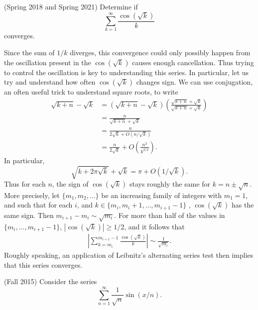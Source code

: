 \documentclass[answers]{exam}
\DeclareMathOperator{\RR}{\mathbb{R}}
\theoremstyle{problemstyle}
\newcommand{\1}[1]{\textbf{1}_{\left[#1\right]}} %
\begin{document}
\begin{questions}
\question (Spring 2018 and Spring 2021) Determine if
%
\[ \sum_{k = 1}^\infty \frac{\cos(\sqrt{k})}{k} \]
%
converges.
\begin{solution}
    Since the sum of $1/k$ diverges, this convergence could only possibly happen from the oscillation present in the $\cos(\sqrt{k})$ causes enough cancellation. Thus trying to control the oscillation is key to understanding this series. In particular, let us try and understand how often $\cos(\sqrt{k})$ changes sign. We can use conjugation, an often useful trick to understand square roots, to write
    \begin{align*}
        \sqrt{k+n} - \sqrt{k} &= (\sqrt{k+n} - \sqrt{k}) \left( \frac{\sqrt{k+n} + \sqrt{k}}{\sqrt{k+n} + \sqrt{k}} \right)\\
        &= \frac{n}{\sqrt{k+n} + \sqrt{k}}\\
        &= \frac{n}{2\sqrt{k} + O(n/\sqrt{k})}\\
        &= \frac{n}{2\sqrt{k}} + O \left( \frac{n^2}{k^{3/2}} \right).
    \end{align*}
    In particular,
    \[ \sqrt{k + 2 \pi \sqrt{k}} + \sqrt{k} = \pi + O(1/\sqrt{k}). \]
    Thus for each $n$, the sign of $\cos(\sqrt{k})$ stays roughly the same for $k = n \pm \sqrt{n}$. More precisely, let $\{ m_1, m_2, \dots \}$ be an increasing family of integers with $m_1 = 1$, and such that for each $i$, and $k \in \{ m_i, m_i + 1, \dots, m_{i+1} - 1 \}$ , $\cos(\sqrt{k})$ has the same sign. Then $m_{i+1} - m_i \sim \sqrt{m_i}$. For more than half of the values in $\{ m_i, \dots, m_{i+1} - 1 \}$, $|\cos(\sqrt{k})| \geq 1/2$, and it follows that
    \begin{align*}
        \left| \sum_{k = m_i}^{m_{i+1} - 1} \frac{\cos(\sqrt{k})}{k} \right| \sim \frac{1}{\sqrt{m_i}}.
    \end{align*}
    Roughly speaking, an application of Leibnitz's alternating series test then implies that this series converges.
\end{solution}


\question (Fall 2015) Consider the series
%
$$ \sum_{n = 1}^\infty \frac{1}{\sqrt{n}} \sin(x/n). $$
%
\end{questions}
\end{document}
